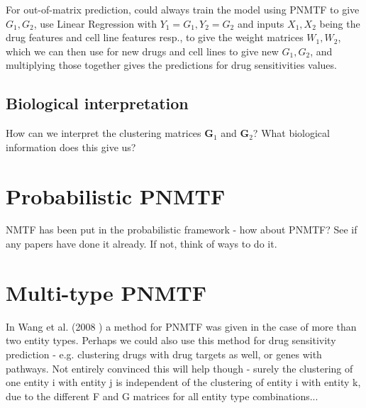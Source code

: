 \documentclass{article}
\begin{document}
			For out-of-matrix prediction, could always train the model using PNMTF to give \( G_1, G_2 \), use Linear Regression with \( Y_1 = G_1, Y_2 = G_2 \) and inputs \( X_1, X_2 \) being the drug features and cell line features resp., to give the weight matrices \( W_1, W_2 \), which we can then use for new drugs and cell lines to give new \( G_1, G_2 \), and multiplying those together gives the predictions for drug sensitivities values.
			
		\subsection{Biological interpretation}
			How can we interpret the clustering matrices \( \boldsymbol G_1 \) and \( \boldsymbol G_2 \)? What biological information does this give us?
	
	
	\section{Probabilistic PNMTF}
		NMTF has been put in the probabilistic framework - how about PNMTF?
		See if any papers have done it already.
		If not, think of ways to do it.
		
	
	\section{Multi-type PNMTF}
		In Wang et al. (2008 \cite{wang_2008}) a method for PNMTF was given in the case of more than two entity types. Perhaps we could also use this method for drug sensitivity prediction - e.g. clustering drugs with drug targets as well, or genes with pathways. Not entirely convinced this will help though - surely the clustering of one entity i with entity j is independent of the clustering of entity i with entity k, due to the different F and G matrices for all entity type combinations... 
	
	
\end{document}
